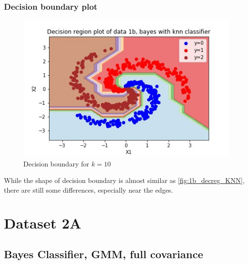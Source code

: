 \documentclass[11pt,a4paper]{article}
\begin{document}
\subsubsection{Decision boundary plot}
\begin{figure}[H]
    \centering
    \includegraphics[scale=0.8]{images/1b_nb_decision_region.jpg}
    \caption{Decision boundary for $k=10$}
    \label{fig:1b_decreg_nb}
\end{figure}
While the shape of decision boundary is almost similar as \autoref{fig:1b_decreg_KNN}, there are still some differences, especially near the edges.

\break
\section{Dataset 2A}
\subsection{Bayes Classifier, GMM, full covariance}
\end{document}
